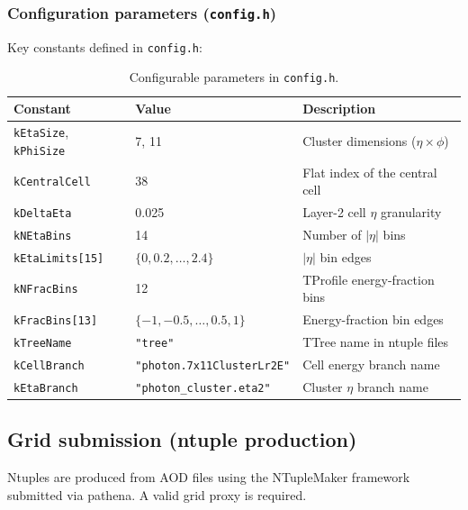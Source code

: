 \documentclass[12pt,a4paper]{article}
\begin{document}
\subsubsection{Configuration parameters (\texttt{config.h})}
\label{sec:running:config}

Key constants defined in \texttt{config.h}:

\begin{table}[htbp]
\centering
\caption{Configurable parameters in \texttt{config.h}.}
\label{tab:config}
\small
\begin{tabular}{llp{7cm}}
\toprule
\textbf{Constant} & \textbf{Value} & \textbf{Description} \\
\midrule
\texttt{kEtaSize}, \texttt{kPhiSize}
  & 7, 11 & Cluster dimensions ($\eta\times\phi$) \\
\texttt{kCentralCell} & 38 & Flat index of the central cell \\
\texttt{kDeltaEta} & 0.025 & Layer-2 cell $\eta$ granularity \\
\texttt{kNEtaBins} & 14 & Number of $|\eta|$ bins \\
\texttt{kEtaLimits[15]}
  & $\{0, 0.2, \ldots, 2.4\}$
  & $|\eta|$ bin edges \\
\texttt{kNFracBins} & 12 & TProfile energy-fraction bins \\
\texttt{kFracBins[13]}
  & $\{-1, -0.5, \ldots, 0.5, 1\}$
  & Energy-fraction bin edges \\
\texttt{kTreeName} & \texttt{"tree"} & TTree name in ntuple files \\
\texttt{kCellBranch}
  & \texttt{"photon.7x11ClusterLr2E"}
  & Cell energy branch name \\
\texttt{kEtaBranch}
  & \texttt{"photon\_cluster.eta2"}
  & Cluster $\eta$ branch name \\
\bottomrule
\end{tabular}
\end{table}

\subsection{Grid submission (ntuple production)}
\label{sec:running:grid}

Ntuples are produced from AOD files using the NTupleMaker framework
submitted via pathena. A valid grid proxy is required.
\end{document}
